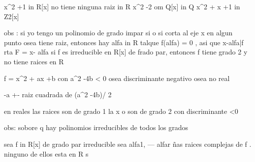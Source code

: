 x^2 +1 in R[x] no tiene ninguna raiz in R 
x^2 -2 om Q[x]                       in Q
x^2 + x +1 in Z2[x]

obs : si yo tengo un polinomio de grado impar si o si corta al eje x en algun punto osea tiene raiz, entonces hay alfa in R talque f(alfa) = 0 , asi que x-alfa|f 
rta  F = x- alfa
si f es irreducible en R[x] de frado par, entonces f tiene grado 2 y no tiene raices en R 


f = x^2 + ax +b con a^2 -4b < 0 osea discriminante negativo osea no real 

-a +- raiz cuadrada de (a^2 -4b)/ 2


en reales las raices son de grado 1 la x o son de grado 2 con discriminante <0 

obs: sobore q hay polinomios irreducibles de todos los grados 

sea f in R[x] de grado par irreducible sea alfa1, --- alfar ñas raices complejas  de f . ninguno de ellos esta en R s